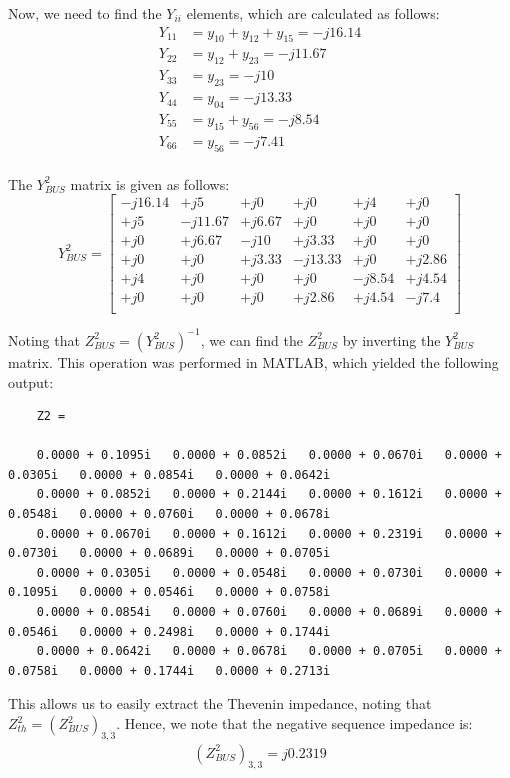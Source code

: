 \documentclass{article}
\begin{document}
Now, we need to find the $Y_{ii}$ elements, which are calculated as follows:
\begin{align*}
Y_{11} &= y_{10} + y_{12} + y_{15} = -j16.14\\
Y_{22} &= y_{12} + y_{23} = -j11.67\\
Y_{33} &= y_{23} = -j10\\
Y_{44} &= y_{04} = -j13.33\\
Y_{55} &= y_{15} + y_{56} = -j8.54\\
Y_{66} &= y_{56} = -j7.41\\
\end{align*}

The $Y^2_{BUS}$ matrix is given as follows:
\hspace{-1cm}
\[
Y^2_{BUS} = 
\begin{bmatrix}
-j16.14 &  +j5 &  +j0 &  +j0 &  +j4 &  +j0\\
+j5 &  -j11.67 &  +j6.67 &  +j0 &  +j0 &  +j0\\
+j0 &  +j6.67 &  -j10 &  +j3.33 &  +j0 &  +j0\\
+j0 &  +j0 &  +j3.33 &  -j13.33 &  +j0 &  +j2.86\\
+j4 &  +j0 &  +j0 &  +j0 &  -j8.54 &  +j4.54\\
+j0 &  +j0 &  +j0 &  +j2.86 &  +j4.54 &  -j7.4\\
\end{bmatrix}
\]

Noting that $Z^2_{BUS} = (Y^2_{BUS})^{-1}$, we can find the $Z^2_{BUS}$ by inverting the $Y^2_{BUS}$ matrix. This operation was performed in MATLAB, which yielded the following output:
{\footnotesize
	\begin{verbatim}
	Z2 =
	
	0.0000 + 0.1095i   0.0000 + 0.0852i   0.0000 + 0.0670i   0.0000 + 0.0305i   0.0000 + 0.0854i   0.0000 + 0.0642i
	0.0000 + 0.0852i   0.0000 + 0.2144i   0.0000 + 0.1612i   0.0000 + 0.0548i   0.0000 + 0.0760i   0.0000 + 0.0678i
	0.0000 + 0.0670i   0.0000 + 0.1612i   0.0000 + 0.2319i   0.0000 + 0.0730i   0.0000 + 0.0689i   0.0000 + 0.0705i
	0.0000 + 0.0305i   0.0000 + 0.0548i   0.0000 + 0.0730i   0.0000 + 0.1095i   0.0000 + 0.0546i   0.0000 + 0.0758i
	0.0000 + 0.0854i   0.0000 + 0.0760i   0.0000 + 0.0689i   0.0000 + 0.0546i   0.0000 + 0.2498i   0.0000 + 0.1744i
	0.0000 + 0.0642i   0.0000 + 0.0678i   0.0000 + 0.0705i   0.0000 + 0.0758i   0.0000 + 0.1744i   0.0000 + 0.2713i
	\end{verbatim}
}

This allows us to easily extract the Thevenin impedance, noting that $Z^2_{th} = (Z^2_{BUS})_{3,3}$. Hence, we note that the negative sequence impedance is:
\begin{align*}
(Z^2_{BUS})_{3,3} = j0.2319
\end{align*}
\end{document}
